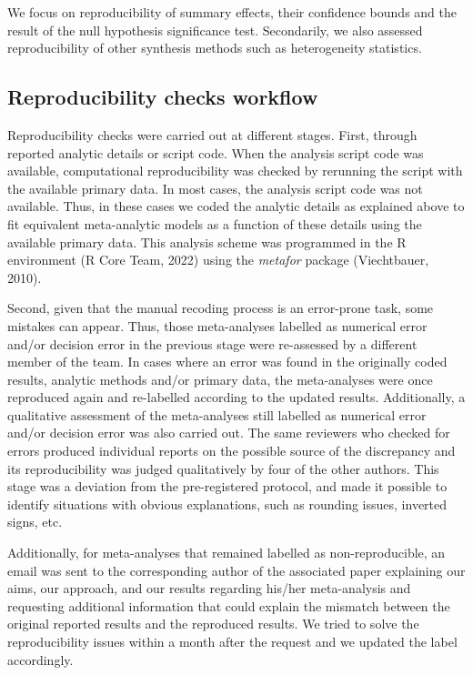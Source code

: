 \documentclass[
  ,man,floatsintext]{apa6}
\begin{document}
We focus on reproducibility of summary effects, their confidence bounds and the result of the null hypothesis significance test. Secondarily, we also assessed reproducibility of other synthesis methods such as heterogeneity statistics.

\hypertarget{reproducibility-checks-workflow}{%
\subsection{Reproducibility checks workflow}\label{reproducibility-checks-workflow}}

Reproducibility checks were carried out at different stages. First, through reported analytic details or script code. When the analysis script code was available, computational reproducibility was checked by rerunning the script with the available primary data. In most cases, the analysis script code was not available. Thus, in these cases we coded the analytic details as explained above to fit equivalent meta-analytic models as a function of these details using the available primary data. This analysis scheme was programmed in the R environment (R Core Team, 2022) using the \emph{metafor} package (Viechtbauer, 2010).

Second, given that the manual recoding process is an error-prone task, some mistakes can appear. Thus, those meta-analyses labelled as numerical error and/or decision error in the previous stage were re-assessed by a different member of the team. In cases where an error was found in the originally coded results, analytic methods and/or primary data, the meta-analyses were once reproduced again and re-labelled according to the updated results. Additionally, a qualitative assessment of the meta-analyses still labelled as numerical error and/or decision error was also carried out. The same reviewers who checked for errors produced individual reports on the possible source of the discrepancy and its reproducibility was judged qualitatively by four of the other authors. This stage was a deviation from the pre-registered protocol, and made it possible to identify situations with obvious explanations, such as rounding issues, inverted signs, etc.

Additionally, for meta-analyses that remained labelled as non-reproducible, an email was sent to the corresponding author of the associated paper explaining our aims, our approach, and our results regarding his/her meta-analysis and requesting additional information that could explain the mismatch between the original reported results and the reproduced results. We tried to solve the reproducibility issues within a month after the request and we updated the label accordingly.
\end{document}
